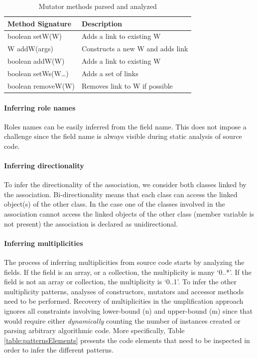 \begin{table}
\caption{Mutator methods parsed and analyzed}
\label{table:mutators}
\centering
    \begin{tabular}{ll}
		\toprule
		\rowcolor[HTML]{BBDAFF}
        \textbf{Method Signature}   & \textbf{Description}    \\ 
        \hline
        boolean setW(W)   & Adds a link to existing W   		\\ 
        W addW(args)    & Constructs a new W and adds link      \\ 
        boolean addW(W)  & Adds a link to existing W            \\ 
        boolean setWs(W…)    & Adds a set of links              \\ 
        boolean removeW(W) &   Removes link to W if possible    \\
        \hline
    \end{tabular}
\end{table}

\paragraph*{Inferring role names}

Roles names can be easily inferred from the field name. This does not impose a challenge since the field name is always visible during static analysis of source code.

\paragraph*{Inferring directionality}

To infer the directionality of the association, we consider both classes linked by the association. Bi-directionality means that each class can access the linked object(s) of the other class. In the case one of the classes involved in the association cannot access the linked objects of the other class (member variable is not present) the association is declared as unidirectional.

\paragraph*{Inferring multiplicities}

The process of inferring multiplicities from source code starts by analyzing the fields. If the field is an array, or a collection, the multiplicity is many `0..*'. If the field is not an array or collection, the multiplicity is `0..1'. To infer the other multiplicity patterns, analyses of constructors, mutators and accessor methods need to be performed.
Recovery of multiplicities in the umplification approach ignores all constraints involving lower-bound (n) and upper-bound (m) since that would require either \textit{dynamically} counting the number of instances created \cite{Kollmann2001} or parsing arbitrary algorithmic code.
More specifically, Table \ref{table:patternsElements} presents the code elements that need to be inspected in order to infer the different patterns.


